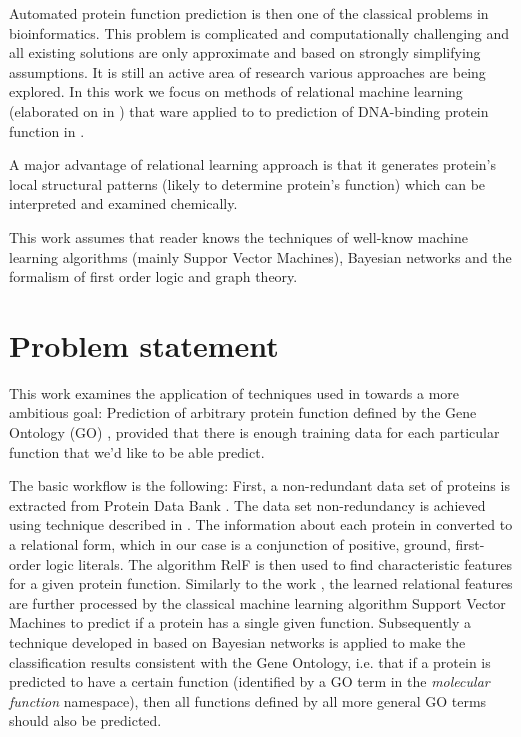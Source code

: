 \documentclass[11pt,twoside,a4paper]{book}
\begin{document}
Automated protein function prediction is then one of the classical problems in bioinformatics. 
This problem is complicated and computationally challenging and all existing solutions
are only approximate and based on strongly simplifying assumptions.
It is still an active area of research various approaches are being explored. 
In this work we focus on methods of relational machine learning (elaborated on in \cite{kuzelka}\cite{relf})
that ware applied to to prediction of DNA-binding protein function in \cite{szabova}.

A major advantage of relational learning approach is that it generates protein's local structural patterns
(likely to determine protein's function) which can be interpreted and examined chemically.

This work assumes that reader knows
the techniques of well-know machine learning algorithms (mainly Suppor Vector Machines),
Bayesian networks
and the formalism of first order logic and graph theory.

\section{Problem statement}

This work examines the application of techniques used in \cite{szabova} towards a more ambitious goal:
Prediction of arbitrary protein function
defined by the Gene Ontology (GO) \cite{go}\cite{gores},
provided that there is enough training data for each particular function that we'd like to be able predict.

The basic workflow is the following:
First, a non-redundant data set of proteins is extracted from Protein Data Bank \cite{pdb}.
The data set non-redundancy is achieved using technique described in \cite{maxind}.
The information about each protein in converted to a relational form, 
which in our case is a conjunction of positive, ground, first-order logic literals.
The algorithm RelF \cite{relf} is then used to find characteristic features
for a given protein function.
Similarly to the work \cite{szabova}, the learned relational features are further
processed by the classical machine learning algorithm Support Vector Machines
to predict if a protein has a single given function.
Subsequently a technique developed in \cite{bnet} based on Bayesian networks is applied to make the classification
results consistent with the Gene Ontology,
i.e. that if a protein is predicted to have a certain function
(identified by a GO term in the \emph{molecular function} namespace),
then all functions defined by all more general GO terms should also be predicted.
\end{document}
